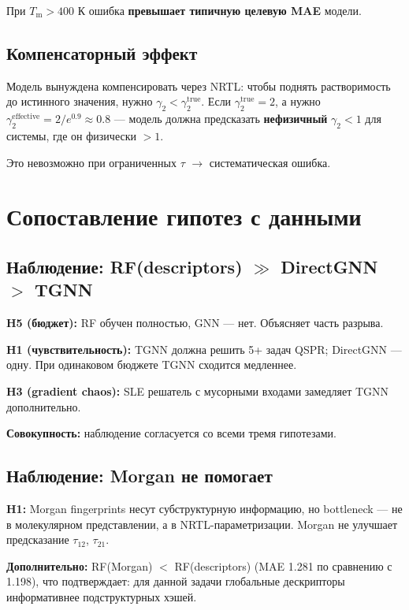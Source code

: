\documentclass[11pt]{article}
\begin{document}
При $T_{\mathrm{m}} > 400$ К ошибка \textbf{превышает типичную целевую MAE} модели.

\subsection{Компенсаторный эффект}

Модель вынуждена компенсировать через NRTL: чтобы поднять растворимость до истинного значения, нужно $\gamma_2 < \gamma_2^{\mathrm{true}}$. Если $\gamma_2^{\mathrm{true}} = 2$, а нужно $\gamma_2^{\mathrm{effective}} = 2 / e^{0.9} \approx 0.8$ --- модель должна предсказать \textbf{нефизичный} $\gamma_2 < 1$ для системы, где он физически $> 1$.

Это невозможно при ограниченных $\tau$ $\to$ систематическая ошибка.

\section{Сопоставление гипотез с данными}

\subsection{Наблюдение: RF(descriptors) $\gg$ DirectGNN $>$ TGNN}

\textbf{H5 (бюджет):} RF обучен полностью, GNN --- нет. Объясняет часть разрыва.

\textbf{H1 (чувствительность):} TGNN должна решить 5+ задач QSPR; DirectGNN --- одну. При одинаковом бюджете TGNN сходится медленнее.

\textbf{H3 (gradient chaos):} SLE решатель с мусорными входами замедляет TGNN дополнительно.

\textbf{Совокупность:} наблюдение согласуется со всеми тремя гипотезами.

\subsection{Наблюдение: Morgan не помогает}

\textbf{H1:} Morgan fingerprints несут субструктурную информацию, но bottleneck --- не в молекулярном представлении, а в NRTL-параметризации. Morgan не улучшает предсказание $\tau_{12}$, $\tau_{21}$.

\textbf{Дополнительно:} RF(Morgan) $<$ RF(descriptors) (MAE 1.281 по сравнению с 1.198), что подтверждает: для данной задачи глобальные дескрипторы информативнее подструктурных хэшей.
\end{document}
